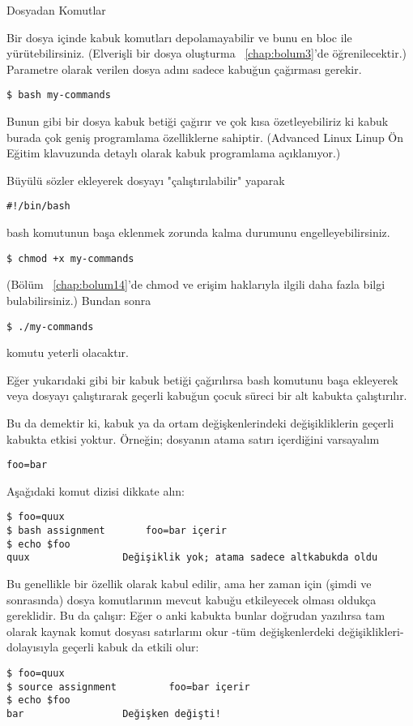 \begin{section}{Dosyadan Komutlar}

Bir dosya içinde kabuk komutları depolamayabilir ve bunu en bloc ile yürütebilirsiniz. (Elverişli bir dosya oluşturma ~\ref{chap:bolum3}'de öğrenilecektir.) Parametre olarak verilen dosya adını sadece kabuğun çağırması gerekir.
\begin{verbatim}
$ bash my-commands
\end{verbatim}

Bunun gibi bir dosya kabuk betiği çağırır ve çok kısa özetleyebiliriz ki kabuk burada çok geniş programlama özelliklerne sahiptir. (Advanced Linux Linup Ön Eğitim klavuzunda detaylı olarak kabuk programlama açıklanıyor.)

Büyülü sözler ekleyerek dosyayı "çalıştırılabilir" yaparak
\begin{verbatim}
#!/bin/bash
\end{verbatim}
		
bash komutunun başa eklenmek zorunda kalma durumunu engelleyebilirsiniz.
\begin{verbatim}
$ chmod +x my-commands
\end{verbatim}
		
(Bölüm ~\ref{chap:bolum14}'de chmod ve erişim haklarıyla ilgili daha fazla bilgi bulabilirsiniz.) Bundan sonra
\begin{verbatim}
$ ./my-commands
\end{verbatim}
komutu yeterli olacaktır.

Eğer yukarıdaki gibi bir kabuk betiği çağırılırsa bash komutunu başa ekleyerek veya dosyayı çalıştırarak geçerli kabuğun çocuk süreci bir alt kabukta çalıştırılır.

Bu da demektir ki, kabuk ya da ortam değişkenlerindeki değişikliklerin geçerli kabukta etkisi yoktur. Örneğin; dosyanın atama satırı içerdiğini varsayalım
\begin{verbatim}
foo=bar
\end{verbatim}

Aşağıdaki komut dizisi dikkate alın:
\begin{verbatim}
$ foo=quux
$ bash assignment 		foo=bar içerir
$ echo $foo
quux 				Değişiklik yok; atama sadece altkabukda oldu
\end{verbatim} 

Bu genellikle bir özellik olarak kabul edilir, ama her zaman için (şimdi ve sonrasında) dosya komutlarının mevcut kabuğu etkileyecek olması oldukça gereklidir. Bu da çalışır: Eğer o anki kabukta bunlar doğrudan yazılırsa tam olarak kaynak komut dosyası satırlarını okur -tüm değişkenlerdeki değişiklikleri- dolayısıyla geçerli kabuk da etkili olur:
\begin{verbatim}
$ foo=quux
$ source assignment 		foo=bar içerir
$ echo $foo
bar 				Değişken değişti!
\end{verbatim}


\end{section}
